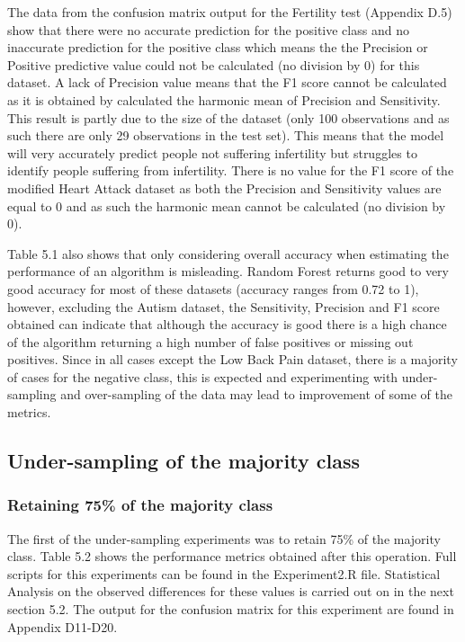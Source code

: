The data from the confusion matrix output for the Fertility test (Appendix D.5)
show that there were no accurate prediction for the positive class and no inaccurate prediction for the positive class which means the the Precision or Positive predictive value could not be calculated (no division by 0) for this dataset. A lack of Precision value means that the F1 score cannot be calculated as it is obtained by calculated the harmonic mean of Precision and Sensitivity.\newline
This result is partly due to the size of the dataset (only 100 observations and as such there are only 29 observations in the test set). This means that the model will very accurately predict people not suffering infertility but struggles to identify people suffering from infertility.\newline
There is no value for the F1 score of the modified Heart Attack dataset as both the Precision and Sensitivity values are equal to 0 and as such the harmonic mean cannot be calculated (no division by 0).

Table 5.1 also shows that only considering overall accuracy when estimating the performance of an algorithm is misleading. Random Forest returns good to very good accuracy for most of these datasets (accuracy ranges from 0.72 to 1), however, excluding the Autism dataset, the Sensitivity, Precision and F1 score obtained can indicate that although the accuracy is good there is a high chance of the algorithm returning a high number of false positives or missing out positives. \newline
Since in all cases except the Low Back Pain dataset, there is a majority of cases for the negative class, this is expected and experimenting with under-sampling and over-sampling of the data may lead to improvement of some of the metrics.


\subsection{Under-sampling of the majority class}
\subsubsection{Retaining 75\% of the majority class}
The first of the under-sampling experiments was to retain 75\% of the majority class. Table 5.2 shows the performance metrics obtained after this operation. Full scripts for this experiments can be found in the Experiment2.R file.
Statistical Analysis on the observed differences for these values is carried out on in the next section 5.2.
The output for the confusion matrix for this experiment are found in Appendix D11-D20.

